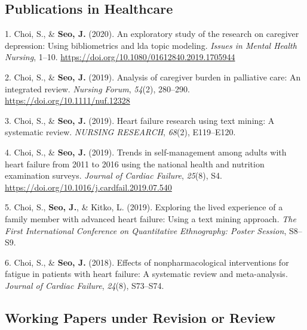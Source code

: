 \documentclass[11pt,a4paper,]{awesome-cv}
\begin{document}
\hypertarget{publications-in-healthcare}{%
\subsection{Publications in
Healthcare}\label{publications-in-healthcare}}

\hypertarget{bibliography}{}
\leavevmode\hypertarget{ref-doi:10.1080ux2f01612840.2019.1705944}{}%
1. Choi, S., \& \textbf{Seo, J.} (2020). An exploratory study of the
research on caregiver depression: Using bibliometrics and lda topic
modeling. \emph{Issues in Mental Health Nursing}, 1--10.
\url{https://doi.org/10.1080/01612840.2019.1705944}

\leavevmode\hypertarget{ref-doi:10.1111ux2fnuf.12328}{}%
2. Choi, S., \& \textbf{Seo, J.} (2019). Analysis of caregiver burden in
palliative care: An integrated review. \emph{Nursing Forum},
\emph{54}(2), 280--290. \url{https://doi.org/10.1111/nuf.12328}

\leavevmode\hypertarget{ref-choi2019heart}{}%
3. Choi, S., \& \textbf{Seo, J.} (2019). Heart failure research using
text mining: A systematic review. \emph{NURSING RESEARCH}, \emph{68}(2),
E119--E120.

\leavevmode\hypertarget{ref-choi2019trends}{}%
4. Choi, S., \& \textbf{Seo, J.} (2019). Trends in self-management among
adults with heart failure from 2011 to 2016 using the national health
and nutrition examination surveys. \emph{Journal of Cardiac Failure},
\emph{25}(8), S4. \url{https://doi.org/10.1016/j.cardfail.2019.07.540}

\leavevmode\hypertarget{ref-choi2019exploring}{}%
5. Choi, S., \textbf{Seo, J.}, \& Kitko, L. (2019). Exploring the lived
experience of a family member with advanced heart failure: Using a text
mining approach. \emph{The First International Conference on
Quantitative Ethnography: Poster Session}, S8--S9.

\leavevmode\hypertarget{ref-choi2018effects}{}%
6. Choi, S., \& \textbf{Seo, J.} (2018). Effects of nonpharmacological
interventions for fatigue in patients with heart failure: A systematic
review and meta-analysis. \emph{Journal of Cardiac Failure},
\emph{24}(8), S73--S74.

\hypertarget{working-papers-under-revision-or-review}{%
\subsection{Working Papers under Revision or
Review}\label{working-papers-under-revision-or-review}}
\end{document}
